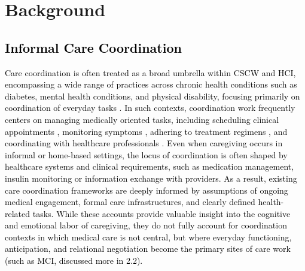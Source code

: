 \documentclass[acmsmall]{acmart}
\begin{document}
\section{Background}

\subsection{\textcolor{black}{Informal Care Coordination}}

\textcolor{black}{Care coordination is often treated as a broad umbrella within CSCW and HCI, encompassing a wide range of practices across chronic health conditions such as diabetes, mental health conditions, and physical disability, focusing primarily on coordination of everyday tasks \cite{foong2020you, schurgin2021isolation}. In such contexts, coordination work frequently centers on managing medically oriented tasks, including scheduling clinical appointments \cite{zubatiy2021empowering}, monitoring symptoms \cite{ullgren2018family, dawber2019comparison}, adhering to treatment regimens \cite{knodel2010role, zhou2025adhera}, and coordinating with healthcare professionals \cite{miller2016partners}. Even when caregiving occurs in informal or home-based settings, the locus of coordination is often shaped by healthcare systems and clinical requirements, such as medication management, insulin monitoring or information exchange with providers. As a result, existing care coordination frameworks are deeply informed by assumptions of ongoing medical engagement, formal care infrastructures, and clearly defined health-related tasks. While these accounts provide valuable insight into the cognitive and emotional labor of caregiving, they do not fully account for coordination contexts in which medical care is not central, but where everyday functioning, anticipation, and relational negotiation become the primary sites of care work (such as MCI, discussed more in 2.2).}
\end{document}
